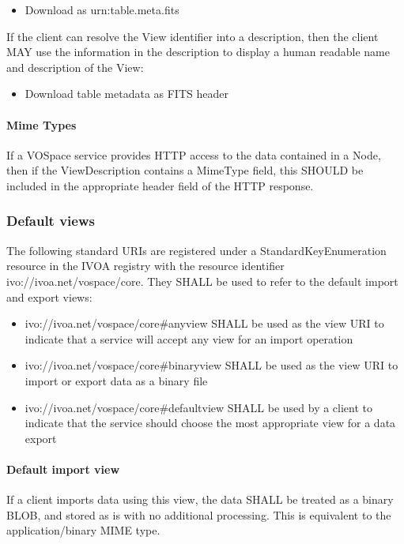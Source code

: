 \documentclass[11pt,a4paper]{ivoa}
\begin{document}
\begin{itemize}
    \item Download as urn:table.meta.fits
\end{itemize}

If the client can resolve the View identifier into a description, then the client MAY use the information in the description to display a human readable name and description of the View:

\begin{itemize}
    \item Download table metadata as FITS header
\end{itemize}

\paragraph{Mime Types}
If a VOSpace service provides HTTP access to the data contained in a Node, then if the ViewDescription contains a MimeType field, this SHOULD be included in the appropriate header field of the HTTP response.

\subsubsection{Default views}
\label{subsubsec:default views}
The following standard URIs are registered under a StandardKeyEnumeration resource \citep{std:STDREGEXT} in the IVOA registry with the resource identifier ivo://ivoa.net/vospace/core. They SHALL be used to refer to the default import and export views:

\begin{itemize}
    \item ivo://ivoa.net/vospace/core\#anyview SHALL be used as the view URI to indicate that a service will accept any view for an import operation
    \item ivo://ivoa.net/vospace/core\#binaryview SHALL be used as the view URI to import or export data as a binary file
    \item ivo://ivoa.net/vospace/core\#defaultview SHALL be used by a client to indicate that the service should choose the most appropriate view for a data export
\end{itemize}

\paragraph{Default import view}
If a client imports data using this view, the data SHALL be treated as a binary BLOB, and stored as is with no additional processing. This is equivalent to the application/binary MIME type.
\end{document}
